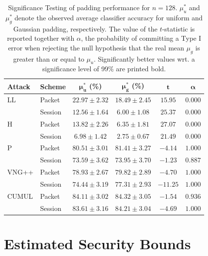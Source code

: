 \documentclass[
	ruledheaders=chapter,
	class=report,
	thesis={type=master, department=inf},
	accentcolor=1c,
	custommargins=true,
	marginpar=false,
	parskip=half-,
	fontsize=11pt,
]{tudapub}
\begin{document}
	\begin{table}
		\centering
		\small
		\begin{tabular}{llcccc}
			\toprule \textbf{Attack} & \textbf{Scheme} & $\mathbf{\mu^*_{u}}$ \textbf{(\%)} & $\mathbf{\mu^*_{g}}$  \textbf{(\%)} & $\mathbf{t}$ & $\mathbf{\alpha}$ \\
			\midrule LL & Packet & $22.97 \pm 2.32$ & $\mathbf{18.49 \pm 2.45}$ & $15.95$ & $0.000$\\
			 & Session & $12.56 \pm 1.64$ & $\mathbf{6.00 \pm 1.08}$ & $25.37$ &  $0.000$\\ \addlinespace
			H & Packet & $13.82 \pm 2.26$ & $\mathbf{6.35 \pm 1.81}$ & $27.07$ & $0.000$ \\
			& Session & $6.98 \pm 1.42$ & $\mathbf{2.75 \pm 0.67}$ & $21.49$ & $0.000$ \\ \addlinespace
			P & Packet & $\mathbf{80.51 \pm 3.01}$ & $81.41 \pm 3.27$ & $-4.14$ & $1.000$ \\
			& Session & $73.59 \pm 3.62$ & $73.95 \pm 3.70$ & $-1.23$ & $0.887$ \\ \addlinespace
			VNG++ & Packet & $\mathbf{78.93 \pm 2.67}$ & $79.82 \pm 2.89$ & $-4.70$ & $1.000$ \\
			& Session & $\mathbf{74.44 \pm 3.19}$ & $77.31 \pm 2.93$ & $-11.25$ & $1.000$ \\ \addlinespace
			CUMUL & Packet & $84.11\pm 3.02$ & $84.32 \pm 3.05$ & $-1.54$ & $0.936$\\
			& Session & $\mathbf{83.61 \pm 3.16}$ & $84.21 \pm 3.04$ & $-4.69$ & $1.000$ \\
			\bottomrule
		\end{tabular}
		\caption[Significance Testing of padding performance for $n = 128$]{Significance Testing of padding performance for $n = 128$. $\mu^*_u$ and $\mu^*_g$ denote the observed average classifier accuracy for uniform and Gaussian padding, respectively. The value of the $t$-statistic is reported together with $\alpha$, the probability of committing a Type I error when rejecting the null hypothesis that the real mean $\mu_g$ is greater than or equal to $\mu_u$. Significantly better values wrt. a significance level of 99\% are printed bold. }
		\label{tbl:sig_score}
	\end{table}

	\section{Estimated Security Bounds}
	\label{security_bounds}
	
\end{document}
